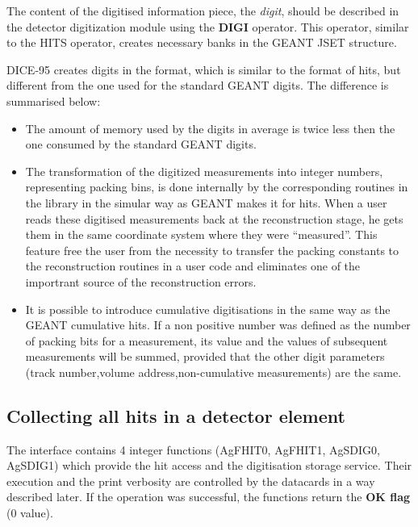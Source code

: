 The  content of the digitised information piece,  the {\it digit}, 
should be described in the detector digitization module
using the {\bf DIGI} operator.
This operator,  similar to the HITS operator,
creates necessary banks in the GEANT JSET structure.

DICE-95 creates digits in the \as format, 
which is similar to the format of hits, 
but different from the one  used for the standard GEANT digits. 
The difference is summarised below:

\begin{itemize}
\item
The amount of  memory used by the \as digits  in average is twice less
then the one consumed by the standard GEANT digits.

\item
The transformation of the digitized measurements into integer numbers,
representing packing bins, is done internally by the corresponding 
routines in the \as library in the simular way as  GEANT makes it for hits.
When a user  reads these digitised measurements 
back at the reconstruction stage, 
he  gets them in the same coordinate system where they were ``measured''.
This feature free the user from the necessity to transfer the 
packing constants to the reconstruction routines in a user code
and eliminates one of the importrant source of the reconstruction errors.


\item
It is possible to introduce cumulative digitisations in the same way
as the GEANT cumulative hits. If a non positive number was defined as
the number of packing bits for a measurement, its value and the values
of subsequent measurements will be summed, 
provided that the other digit parameters 
(track number,volume address,non-cumulative measurements)
are the same.

\end{itemize}


\subsection{Collecting all hits in a detector element}

The \as interface contains 4 integer functions
(AgFHIT0, AgFHIT1, AgSDIG0, AgSDIG1) which provide 
the hit access and the digitisation storage service.
Their execution and the print verbosity are controlled
by the datacards in a way described later.
If the operation was successful, the functions
return the {\bf OK flag} (0 value).

